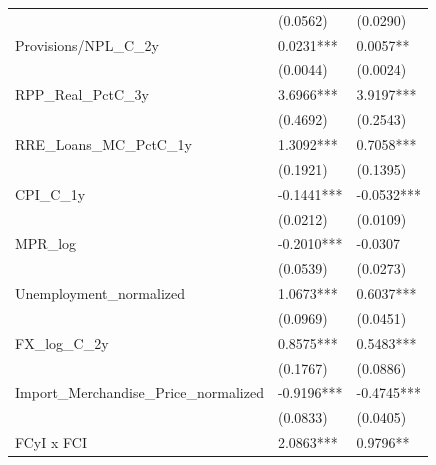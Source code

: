 \begin{table}[!ht]
\begin{center}
{\begin{tabular}{p{7cm}p{3cm}p{3cm}}
                                           & (0.0562)                    & (0.0290)                     \\
Provisions/NPL\_C\_2y                      & 0.0231***                   & 0.0057**                     \\
                                           & (0.0044)                    & (0.0024)                     \\
RPP\_Real\_PctC\_3y                        & 3.6966***                   & 3.9197***                    \\
                                           & (0.4692)                    & (0.2543)                     \\
RRE\_Loans\_MC\_PctC\_1y                   & 1.3092***                   & 0.7058***                    \\
                                           & (0.1921)                    & (0.1395)                     \\
CPI\_C\_1y                                 & -0.1441***                  & -0.0532***                   \\
                                           & (0.0212)                    & (0.0109)                     \\
MPR\_log                                   & -0.2010***                  & -0.0307                      \\
                                           & (0.0539)                    & (0.0273)                     \\
Unemployment\_normalized                   & 1.0673***                   & 0.6037***                    \\
                                           & (0.0969)                    & (0.0451)                     \\
FX\_log\_C\_2y                             & 0.8575***                   & 0.5483***                    \\
                                           & (0.1767)                    & (0.0886)                     \\
Import\_Merchandise\_Price\_normalized     & -0.9196***                  & -0.4745***                   \\
                                           & (0.0833)                    & (0.0405)                     \\
FCyI x FCI                                 & 2.0863***                   & 0.9796**                     \\

\end{tabular}}
\end{center}
\end{table}
